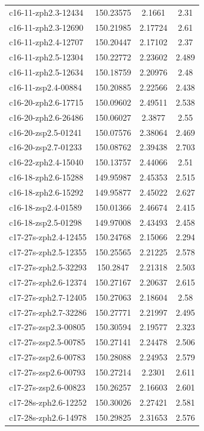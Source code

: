 \documentclass[twocolumn,tight,times]{aastex63}
\begin{document}
\begin{center}
\begin{longtable}{l|c|c|c}
c16-11-zph2.3-12434 & 150.23575 & 2.1661 & 2.31 \\
c16-11-zph2.3-12690 & 150.21985 & 2.17724 & 2.61 \\
c16-11-zph2.4-12707 & 150.20447 & 2.17102 & 2.37 \\
c16-11-zph2.5-12304 & 150.22772 & 2.23602 & 2.489 \\
c16-11-zph2.5-12634 & 150.18759 & 2.20976 & 2.48 \\
c16-11-zsp2.4-00884 & 150.20885 & 2.22566 & 2.438 \\
c16-20-zph2.6-17715 & 150.09602 & 2.49511 & 2.538 \\
c16-20-zph2.6-26486 & 150.06027 & 2.3877 & 2.55 \\
c16-20-zsp2.5-01241 & 150.07576 & 2.38064 & 2.469 \\
c16-20-zsp2.7-01233 & 150.08762 & 2.39438 & 2.703 \\
c16-22-zph2.4-15040 & 150.13757 & 2.44066 & 2.51 \\
c16-18-zph2.6-15288 & 149.95987 & 2.45353 & 2.515 \\
c16-18-zph2.6-15292 & 149.95877 & 2.45022 & 2.627 \\
c16-18-zsp2.4-01589 & 150.01366 & 2.46674 & 2.415 \\
c16-18-zsp2.5-01298 & 149.97008 & 2.43493 & 2.458 \\
c17-27s-zph2.4-12455 & 150.24768 & 2.15066 & 2.294 \\
c17-27s-zph2.5-12355 & 150.25565 & 2.21225 & 2.578 \\
c17-27s-zph2.5-32293 & 150.2847 & 2.21318 & 2.503 \\
c17-27s-zph2.6-12374 & 150.27167 & 2.20637 & 2.615 \\
c17-27s-zph2.7-12405 & 150.27063 & 2.18604 & 2.58 \\
c17-27s-zph2.7-32286 & 150.27771 & 2.21997 & 2.495 \\
c17-27s-zsp2.3-00805 & 150.30594 & 2.19577 & 2.323 \\
c17-27s-zsp2.5-00785 & 150.27141 & 2.24478 & 2.506 \\
c17-27s-zsp2.6-00783 & 150.28088 & 2.24953 & 2.579 \\
c17-27s-zsp2.6-00793 & 150.27214 & 2.2301 & 2.611 \\
c17-27s-zsp2.6-00823 & 150.26257 & 2.16603 & 2.601 \\
c17-28s-zph2.6-12252 & 150.30026 & 2.27421 & 2.581 \\
c17-28s-zph2.6-14978 & 150.29825 & 2.31653 & 2.576 \\

\end{longtable}
\end{center}
\end{document}
